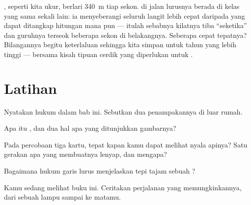 \begin{remark}\label{rem:g4:light-straight-lines:speed}
, seperti kita ukur, berlari \qty{340}{m} tiap sekon.  di
jalan lurusnya berada di kelas yang sama sekali lain: ia menyeberangi
seluruh langit lebih cepat daripada yang dapat ditangkap hitungan mana
pun --- itulah sebabnya kilatnya tiba ``seketika'' dan guruhnya
terseok beberapa sekon di belakangnya. Seberapa cepat tepatnya?
Bilangannya begitu keterlaluan sehingga kita simpan untuk tahun yang
lebih tinggi --- bersama kisah tipuan cerdik yang diperlukan untuk
.
\end{remark}

\section{Latihan}

\begin{exercise}[$\star$]\label{exo:g4:light-straight-lines:1}
Nyatakan hukum dalam bab ini. Sebutkan dua penampakannya di luar
rumah.
\end{exercise}

\begin{exercise}[$\star$]\label{exo:g4:light-straight-lines:2}
Apa itu , dan dua hal apa yang ditunjukkan gambarnya?
\end{exercise}

\begin{exercise}[$\star$]\label{exo:g4:light-straight-lines:3}
Pada percobaan tiga kartu, tepat kapan kamu dapat melihat nyala
apinya? Satu gerakan apa yang membuatnya lenyap, dan mengapa?
\end{exercise}

\begin{exercise}[$\star$]\label{exo:g4:light-straight-lines:4}
Bagaimana hukum garis lurus menjelaskan tepi tajam sebuah
?
\end{exercise}

\begin{exercise}[$\star$]\label{exo:g4:light-straight-lines:5}
Kamu sedang melihat buku ini. Ceritakan perjalanan  yang
memungkinkannya, dari sebuah lampu sampai ke matamu.
\end{exercise}

